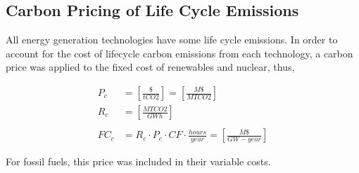 \subsection{Carbon Pricing of Life Cycle Emissions}
All energy generation technologies have some life cycle emissions.
In order to account for the cost of lifecycle carbon emissions from each 
technology, a carbon price was applied to the fixed cost of renewables and 
nuclear, thus,

\begin{align}
P_c &= \left[\frac{\$}{tCO2}\right] = \left[\frac{M\$}{MTCO2}\right]\\
R_c &= \left[\frac{MTCO2}{GWh}\right]\\\\
FC_c &= R_c\cdot P_c \cdot CF \cdot \frac{hours}{year} = \left[\frac{M\$}{GW-year}\right]
\end{align}

For fossil fuels, this price was included in their variable costs.
